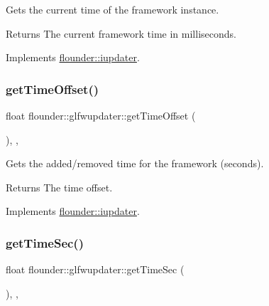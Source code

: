 Gets the current time of the framework instance. 

\begin{DoxyReturn}{Returns}
The current framework time in milliseconds. 
\end{DoxyReturn}


Implements \hyperlink{classflounder_1_1iupdater_a6f5a67e27507165d4423b32e29ca3446}{flounder\+::iupdater}.

\mbox{\label{classflounder_1_1glfwupdater_a7d37c7454419a6756c56b3a6412f6d20}} 
\subsubsection{\texorpdfstring{get\+Time\+Offset()}{getTimeOffset()}}
{\footnotesize\ttfamily float flounder\+::glfwupdater\+::get\+Time\+Offset (\begin{DoxyParamCaption}{ }\end{DoxyParamCaption})\hspace{0.3cm}{\ttfamily [inline]}, {\ttfamily [override]}, {\ttfamily [virtual]}}



Gets the added/removed time for the framework (seconds). 

\begin{DoxyReturn}{Returns}
The time offset. 
\end{DoxyReturn}


Implements \hyperlink{classflounder_1_1iupdater_a4e682002890f952dee48c646fce39824}{flounder\+::iupdater}.

\mbox{\label{classflounder_1_1glfwupdater_a01b583f6e4b5ae90eb9d74f931d80081}} 
\subsubsection{\texorpdfstring{get\+Time\+Sec()}{getTimeSec()}}
{\footnotesize\ttfamily float flounder\+::glfwupdater\+::get\+Time\+Sec (\begin{DoxyParamCaption}{ }\end{DoxyParamCaption})\hspace{0.3cm}{\ttfamily [inline]}, {\ttfamily [override]}, {\ttfamily [virtual]}}



